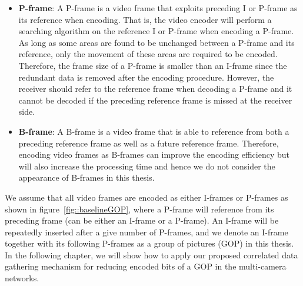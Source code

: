 {\begin{itemize}
The interval between successive I-frames is an important issue in the H.264 video compression technique.
On one hand, I-frames are necessary for random accessing different parts of the video files since they are the only frame type which can be decoded independently.
On the other hand, encoding video frames as I-frames has the drawback that they are the largest in terms of frame size since only intra-frame redundancy can be removed for this type of frames.
\item \textbf{P-frame}:
A P-frame is a video frame that exploits preceding I or P-frame as its reference when encoding.
That is, the video encoder will perform a searching algorithm on the reference I or P-frame when encoding a P-frame.
As long as some areas are found to be unchanged between a P-frame and its reference, only the movement of these areas are required to be encoded.
Therefore, the frame size of a P-frame is smaller than an I-frame since the redundant data is removed after the encoding procedure.
However, the receiver should refer to the reference frame when decoding a P-frame and it cannot be decoded if the preceding reference frame is missed at the receiver side.
\item \textbf{B-frame}:
A B-frame is a video frame that is able to reference from both a preceding reference frame as well as a future reference frame.
Therefore, encoding video frames as B-frames can improve the encoding efficiency but will also increase the processing time and hence we do not consider the appearance of B-frames in this thesis.
\end{itemize}

We assume that all video frames are encoded as either I-frames or P-frames as shown in figure~\ref{fig::baselineGOP}, where a P-frame will reference from its preceding frame (can be either an I-frame or a P-frame).
An I-frame will be repeatedly inserted after a give number of P-frames, and we denote an I-frame together with its following P-frames as a group of pictures (GOP) in this thesis.
In the following chapter, we will show how to apply our proposed correlated data gathering mechanism for reducing encoded bits of a GOP in the multi-camera networks.
%
}
